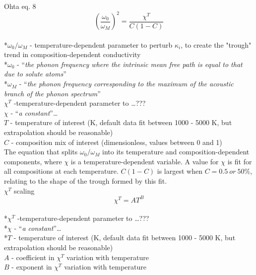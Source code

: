 Ohta eq. 8 
\begin{equation}%
\left ( \frac{\omega_{0}}{\omega_{M}} \right )^{2}=\frac{\chi^{T}}{C\left ( 1-C \right )}  
\label{eq.ohta8}
\end{equation}%
\\ *$\omega_{0}/\omega_{M}$ - temperature-dependent parameter to perturb $\kappa_{i}$, to create the "trough" trend in composition-dependent conductivity\\
*$\omega_{0}$ - \enquote{\textit{the phonon frequency where the intrinsic mean free path is equal to that due to solute atoms}}\\
*$\omega_{M}$ - \enquote{\textit{the phonon frequency corresponding to the maximum of the acoustic branch of the phonon spectrum}}\\
$\chi^{T}$ -temperature-dependent parameter to \dots ??? \\
$\chi$ - \enquote{\textit{a constant}}\dots\\
$T$ - temperature of interest (K, default data fit between 1000 - 5000 K, but extrapolation should be reasonable)\\                    
$C$ - composition mix of interest (dimensionless, values between 0 and 1)\\

The equation that splits $\omega_{0}/\omega_{M}$ into its temperature and composition-dependent components, where $\chi$ is a temperature-dependent variable. A value for $\chi$ is fit for all compositions at each temperature. $C\left ( 1-C \right )$ is largest when $C=0.5\ or\ 50\%$, relating to the shape of the trough formed by this fit.\\

$\chi^{T}$ scaling 
\begin{equation}%
\chi^{T}=A T^{B}
\label{eq.chi_scale}
\end{equation}%
\\ *$\chi^{T}$ -temperature-dependent parameter to \dots ??? \\
*$\chi$ - \enquote{\textit{a constant}}\dots\\
*$T$ - temperature of interest (K, default data fit between 1000 - 5000 K, but extrapolation should be reasonable)\\                    
$A$ - coefficient in $\chi^{T}$ variation with temperature\\
$B$ - exponent in $\chi^{T}$ variation with temperature\\

